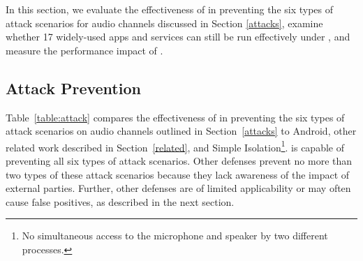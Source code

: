 In this section, we evaluate the effectiveness of \system in preventing the six types of attack scenarios for audio channels discussed in Section \ref{attacks}, examine whether 17 widely-used apps and services can still be run effectively under \system, and measure the performance impact of \system.  
\vspace{-0.08in}


\subsection{Attack Prevention}

Table~\ref{table:attack} compares the effectiveness of \system in preventing the six types of attack scenarios on audio channels outlined in Section~\ref{attacks} to Android, other related work described in Section~\ref{related}, and Simple Isolation\footnote{No simultaneous access to the microphone and speaker by two different processes.}.  \system is capable of preventing all six types of attack scenarios.  Other defenses prevent no more than two types of these attack scenarios because they lack awareness of the impact of external parties.
Further, other defenses are of limited applicability or may often cause false positives, as described in the next section.

